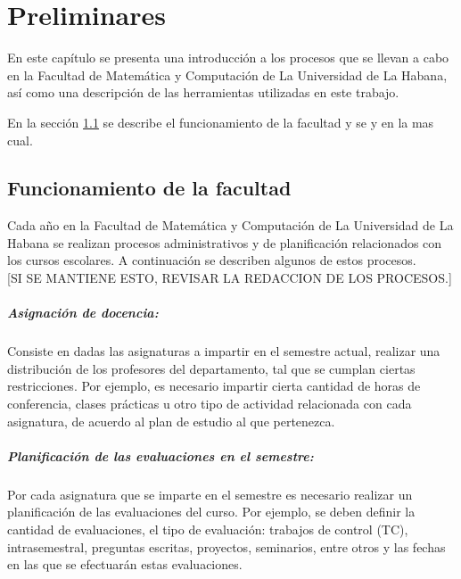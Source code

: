 \chapter{Preliminares}\label{chapter:preliminaries}
En este capítulo se presenta una introducción a los procesos que se llevan a cabo en la Facultad
de Matemática y Computación de La Universidad de La Habana, así
como una descripción de las herramientas utilizadas 
en este trabajo. 

En la sección \ref{section:funcionamiento de la facultad} se describe el funcionamiento 
de la facultad y se  y en la mas cual.

\section{Funcionamiento de la facultad}\label{section:funcionamiento de la facultad}


Cada año en la Facultad de Matemática y Computación de La 
Universidad de La Habana se realizan procesos administrativos y de 
planificación relacionados con los cursos escolares. A continuación se describen 
algunos de estos procesos. \\

[SI SE MANTIENE ESTO, REVISAR LA REDACCION DE LOS PROCESOS.] \\

\paragraph{Asignación de docencia:}
Consiste en dadas las asignaturas a impartir en el semestre actual,
realizar una distribución de los profesores del departamento, tal que se 
cumplan ciertas restricciones. Por ejemplo, es necesario impartir
cierta cantidad de horas de conferencia, clases prácticas u otro tipo de actividad 
relacionada con cada asignatura, de acuerdo al plan de estudio al que pertenezca.

\paragraph{Planificación de las evaluaciones en el semestre:}
Por cada asignatura que se imparte en el semestre es necesario realizar un planificación de 
las evaluaciones del curso. Por ejemplo, se deben definir la cantidad de evaluaciones, el tipo 
de evaluación: trabajos de control (TC), intrasemestral, preguntas escritas, proyectos, seminarios, entre 
otros y las fechas en las que se efectuarán estas evaluaciones.

